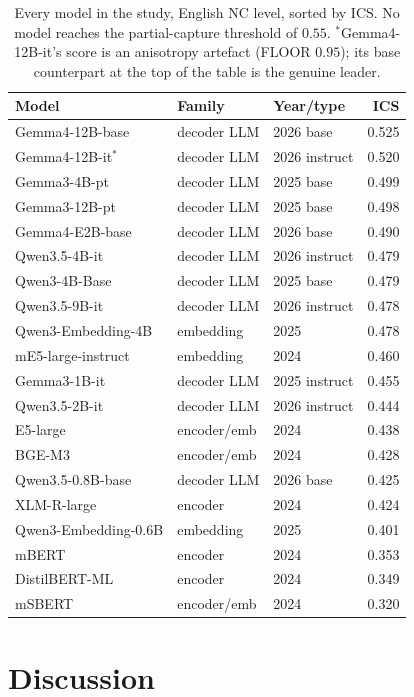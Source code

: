 \documentclass[11pt]{article}
\begin{document}
\begin{table}[H]
\centering
\footnotesize
\begin{tabular}{lll r}
\toprule
Model & Family & Year/type & ICS \\
\midrule
Gemma4-12B-base & decoder LLM & 2026 base & 0.525 \\
Gemma4-12B-it$^\ast$ & decoder LLM & 2026 instruct & 0.520 \\
Gemma3-4B-pt & decoder LLM & 2025 base & 0.499 \\
Gemma3-12B-pt & decoder LLM & 2025 base & 0.498 \\
Gemma4-E2B-base & decoder LLM & 2026 base & 0.490 \\
Qwen3.5-4B-it & decoder LLM & 2026 instruct & 0.479 \\
Qwen3-4B-Base & decoder LLM & 2025 base & 0.479 \\
Qwen3.5-9B-it & decoder LLM & 2026 instruct & 0.478 \\
Qwen3-Embedding-4B & embedding & 2025 & 0.478 \\
mE5-large-instruct & embedding & 2024 & 0.460 \\
Gemma3-1B-it & decoder LLM & 2025 instruct & 0.455 \\
Qwen3.5-2B-it & decoder LLM & 2026 instruct & 0.444 \\
E5-large & encoder/emb & 2024 & 0.438 \\
BGE-M3 & encoder/emb & 2024 & 0.428 \\
Qwen3.5-0.8B-base & decoder LLM & 2026 base & 0.425 \\
XLM-R-large & encoder & 2024 & 0.424 \\
Qwen3-Embedding-0.6B & embedding & 2025 & 0.401 \\
mBERT & encoder & 2024 & 0.353 \\
DistilBERT-ML & encoder & 2024 & 0.349 \\
mSBERT & encoder/emb & 2024 & 0.320 \\
\bottomrule
\end{tabular}
\caption{Every model in the study, English NC level, sorted by ICS. No model reaches the
partial-capture threshold of $0.55$. $^\ast$Gemma4-12B-it's score is an anisotropy artefact (FLOOR
$0.95$); its base counterpart at the top of the table is the genuine leader.}
\label{tab:master}
\end{table}

\section{Discussion}
\label{sec:discussion}
\end{document}
